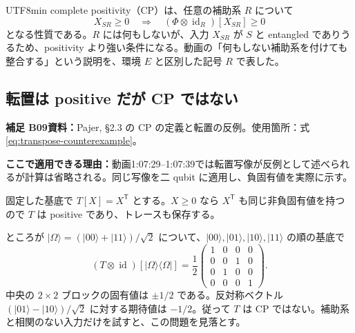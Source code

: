 \documentclass[11pt,a4paper]{article}
\numberwithin{equation}{section}
\newcommand{\id}{\operatorname{id}}
\newcommand{\ket}[1]{\lvert#1\rangle}
\newcommand{\bra}[1]{\langle#1\rvert}
\newcommand{\supp}[3]{\par\smallskip\noindent\textcolor{BrickRed}{\textbf{補足 #1}}\quad\textbf{資料：}#2\par\noindent\textbf{ここで適用できる理由：}#3\par}
\begin{document}
\begin{CJK*}{UTF8}{min}
complete positivity（CP）は、任意の補助系 $R$ について
\begin{equation}
X_{SR}\geq0\quad\Longrightarrow\quad
(\Phi\otimes\id_R)[X_{SR}]\geq0
\label{eq:cpdefinition}
\end{equation}
となる性質である。$R$ には何もしないが、入力 $X_{SR}$ が $S$ と entangled でありうるため、positivity より強い条件になる。動画の「何もしない補助系を付けても整合する」という説明を、環境 $E$ と区別した記号 $R$ で表した。

\subsection{転置は positive だが CP ではない}
\supp{B09}{Pajer\cite{pajer}, §2.3 の CP の定義と転置の反例。使用箇所：式\eqref{eq:transpose-counterexample}。}{動画1:07:29--1:07:39では転置写像が反例として述べられるが計算は省略される。同じ写像を二 qubit に適用し、負固有値を実際に示す。}
固定した基底で $T[X]=X^{\mathsf T}$ とする。$X\geq0$ なら $X^{\mathsf T}$ も同じ非負固有値を持つので $T$ は positive であり、トレースも保存する。

ところが $\ket{\Omega}=(\ket{00}+\ket{11})/\sqrt2$ について、$\ket{00},\ket{01},\ket{10},\ket{11}$ の順の基底で
\begin{equation}
(T\otimes\id)[\ket{\Omega}\bra{\Omega}]
=\frac12\begin{pmatrix}
1&0&0&0\\0&0&1&0\\0&1&0&0\\0&0&0&1
\end{pmatrix}.
\label{eq:transpose-counterexample}
\end{equation}
中央の $2\times2$ ブロックの固有値は $\pm1/2$ である。反対称ベクトル $(\ket{01}-\ket{10})/\sqrt2$ に対する期待値は $-1/2$。従って $T$ は CP ではない。補助系と相関のない入力だけを試すと、この問題を見落とす。


\end{CJK*}
\end{document}
